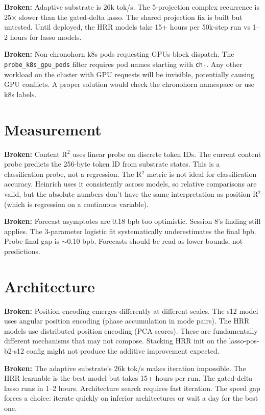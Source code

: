 \documentclass[11pt,a4paper]{report}
\newcommand{\broken}[1]{\textcolor{broken}{\textbf{Broken:}} #1}
\begin{document}
\broken{Adaptive substrate is 26k tok/s.} The 5-projection complex recurrence is 25$\times$ slower than the gated-delta lasso. The shared projection fix is built but untested. Until deployed, the HRR models take 15+ hours per 50k-step run vs 1--2 hours for lasso models.

\broken{Non-chronohorn k8s pods requesting GPUs block dispatch.} The \texttt{probe\_k8s\_gpu\_pods} filter requires pod names starting with \texttt{ch-}. Any other workload on the cluster with GPU requests will be invisible, potentially causing GPU conflicts. A proper solution would check the chronohorn namespace or use k8s labels.

\section{Measurement}

\broken{Content R$^2$ uses linear probe on discrete token IDs.} The current content probe predicts the 256-byte token ID from substrate states. This is a classification probe, not a regression. The R$^2$ metric is not ideal for classification accuracy. Heinrich uses it consistently across models, so relative comparisons are valid, but the absolute numbers don't have the same interpretation as position R$^2$ (which is regression on a continuous variable).

\broken{Forecast asymptotes are 0.18 bpb too optimistic.} Session 8's finding still applies. The 3-parameter logistic fit systematically underestimates the final bpb. Probe-final gap is $\sim$0.10 bpb. Forecasts should be read as lower bounds, not predictions.

\section{Architecture}

\broken{Position encoding emerges differently at different scales.} The s12 model uses angular position encoding (phase accumulation in mode pairs). The HRR models use distributed position encoding (PCA scores). These are fundamentally different mechanisms that may not compose. Stacking HRR init on the lasso-pos-b2-s12 config might not produce the additive improvement expected.

\broken{The adaptive substrate's 26k tok/s makes iteration impossible.} The HRR learnable is the best model but takes 15+ hours per run. The gated-delta lasso runs in 1--2 hours. Architecture search requires fast iteration. The speed gap forces a choice: iterate quickly on inferior architectures or wait a day for the best one.
\end{document}
